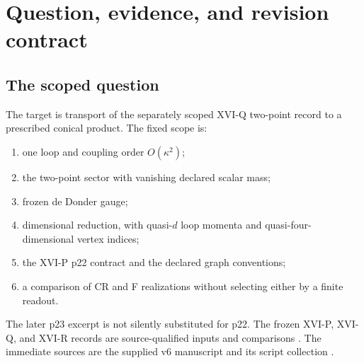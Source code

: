 \documentclass[11pt,a4paper]{article}
\newcommand{\ka}{\kappa}
\newcommand{\NOTCLOSED}{\texttt{NOT\_CLOSED}}
\theoremstyle{plain}
\theoremstyle{definition}
\theoremstyle{remark}
\numberwithin{equation}{section}
\begin{document}
\begin{abstract}
\emph{(4) New mixed-channel finding.} The engine slice exposes
hidden mixed pairs. These are pairs whose circle pole vanishes
while their Feynman density does not. In D01, the lattice keys
\((4,4),(4,7),(5,5),(7,4),(7,7)\) carry a mixed
\((0,2)\) density proportional to \(P^2(6x^2-10x+3)\).
The printed v6 \(hh\) branch difference is therefore unchanged in
value. Its status becomes conditional on the corresponding
mixed-channel trace. A per-mode Duhamel identity and a reduction
formula are proved, but the D04 part of the second \(\phi\phi\)
value stays open.

\emph{(5) Evanescent coefficients.} Under an explicitly declared
slice-DRED prescription with formal \(\tilde g\) components, the
number of evanescent pole coefficients is 86 on each physical
branch and 113 on the UNIT lattice. They are prescription
conditional.

No missing value is set to zero.
The exact rank statement has status
\texttt{CLOSED\_PENDING\_}\allowbreak\texttt{INDEPENDENT\_REVIEW}
only on its precisely stated finite scope. Overall:
\[
 \text{O.1 on the cone}=\NOTCLOSED,\qquad
 \texttt{bulk\_symmetry\_restored}=\texttt{false}.
\]
\end{abstract}

\tableofcontents

\section{Question, evidence, and revision contract}
\label{sec:scope}

\subsection{The scoped question}

The target is transport of the separately scoped XVI-Q two-point
record to a prescribed conical product. The fixed scope is:
\begin{enumerate}[label=\textup{(\roman*)}]
\item one loop and coupling order \(O(\ka^2)\);
\item the two-point sector with vanishing declared scalar mass;
\item frozen de Donder gauge;
\item dimensional reduction, with quasi-\(d\) loop momenta and
quasi-four-dimensional vertex indices;
\item the XVI-P p22 contract and the declared graph conventions;
\item a comparison of CR and F realizations without selecting
either by a finite readout.
\end{enumerate}
The later p23 excerpt is not silently substituted for p22.
The frozen XVI-P, XVI-Q, and XVI-R records are source-qualified
inputs and comparisons \cite{CheungP,CheungQ,CheungR}.
The immediate sources are the supplied v6 manuscript and its
script collection \cite{CheungConeV6,CheungConeScripts}.
\end{document}
